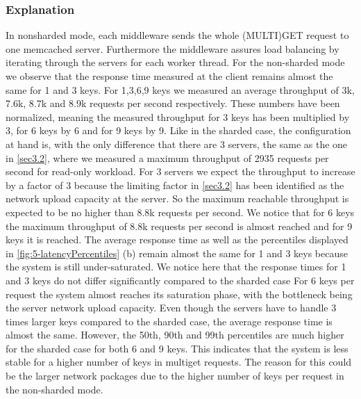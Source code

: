 \documentclass[11pt,a4paper]{article}
\begin{document}
\subsubsection{Explanation}

In nonsharded mode, each middleware sends the whole (MULTI)GET request to one memcached server. Furthermore the middleware assures load balancing by iterating through the servers for each worker thread.
For the non-sharded mode we observe that the response time measured at the client remains almost the same for 1 and 3 keys. For 1,3,6,9 keys we measured an average throughput of 3k, 7.6k, 8.7k and 8.9k requests per second respectively. These numbers have been normalized, meaning the measured throughput for 3 keys has been multiplied by 3, for 6 keys by 6 and for 9 keys by 9.
Like in the sharded case, the configuration at hand is, with the only difference that there are 3 servers, the same as the one in \autoref{sec3.2}, where we measured a maximum throughput of 2935 requests per second for read-only workload. For 3 servers we expect the throughput to increase by a factor of 3 because the limiting factor in \autoref{sec3.2} has been identified as the network upload capacity at the server. So the maximum reachable throughput is expected to be no higher than 8.8k requests per second.
We notice that for 6 keys the maximum throughput of 8.8k requests per second is almost reached and for 9 keys it is reached.
The average response time as well as the percentiles displayed in \autoref{fig:5-latencyPercentiles} (b) remain almost the same for 1 and 3 keys because the system is still under-saturated. We notice here that the response times for 1 and 3 keys do not differ significantly compared to the sharded case
For 6 keys per request the system almost reaches its saturation phase, with the bottleneck being the server network upload capacity. Even though the servers have to handle 3 times larger keys compared to the sharded case, the average response time is almost the same. However, the 50th, 90th and 99th percentiles are much higher for the sharded case for both 6 and 9 keys. This indicates that the system is less stable for a higher number of keys in multiget requests. The reason for this could be the larger network packages due to the higher number of keys per request in the non-sharded mode.
\end{document}
